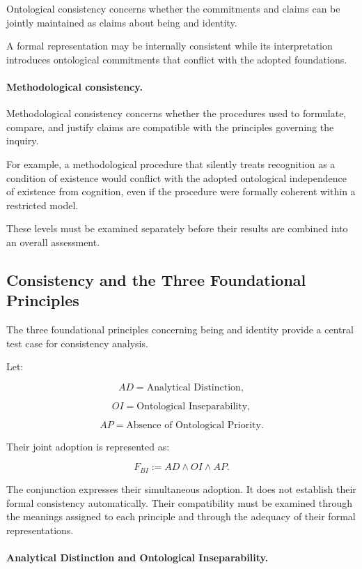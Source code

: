 Ontological consistency concerns whether the commitments
and claims can be jointly maintained as claims about being
and identity.

A formal representation may be internally consistent while
its interpretation introduces ontological commitments that
conflict with the adopted foundations.

\paragraph{Methodological consistency.}

Methodological consistency concerns whether the procedures
used to formulate, compare, and justify claims are compatible
with the principles governing the inquiry.

For example, a methodological procedure that silently treats
recognition as a condition of existence would conflict with
the adopted ontological independence of existence from
cognition, even if the procedure were formally coherent
within a restricted model.

These levels must be examined separately before their
results are combined into an overall assessment.

\subsection{Consistency and the Three Foundational Principles}

The three foundational principles concerning being and
identity provide a central test case for consistency analysis.

Let:

\[
    AD = \text{Analytical Distinction},
\]

\[
    OI = \text{Ontological Inseparability},
\]

\[
    AP = \text{Absence of Ontological Priority}.
\]

Their joint adoption is represented as:

\[
    F_{BI} := AD \land OI \land AP.
\]

The conjunction expresses their simultaneous adoption.
It does not establish their formal consistency automatically.
Their compatibility must be examined through the meanings
assigned to each principle and through the adequacy of their
formal representations.

\paragraph{Analytical Distinction and Ontological Inseparability.}

